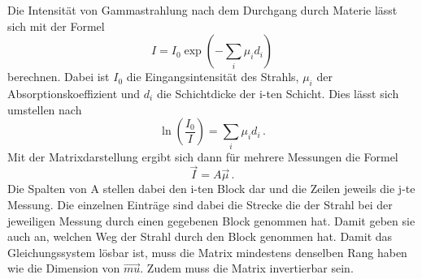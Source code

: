 Die Intensität von Gammastrahlung nach dem Durchgang durch Materie lässt sich mit der Formel
\begin{equation}
    I = I_0 \exp(-\sum_i \mu_i d_i)
\end{equation}
berechnen.
Dabei ist $I_0$ die Eingangsintensität des Strahls, $\mu_i$ der Absorptionskoeffizient und $d_i$ die Schichtdicke der i-ten Schicht.
Dies lässt sich umstellen nach
\begin{equation}
    \ln(\frac{I_0}{I}) = \sum_i \mu_i d_i \,.
\end{equation}
Mit der Matrixdarstellung ergibt sich dann für mehrere Messungen die Formel
\begin{equation}
    \label{eqn:matrixA}
    \vec{I} = A \vec{\mu} \,.
\end{equation}
Die Spalten von A stellen dabei den i-ten Block dar und die Zeilen jeweils die j-te Messung. Die einzelnen Einträge sind dabei die Strecke die der Strahl bei der jeweiligen Messung durch einen gegebenen Block genommen hat. Damit geben sie auch an, welchen Weg der Strahl durch den Block genommen hat.
Damit das Gleichungssystem lösbar ist, muss die Matrix mindestens denselben Rang haben wie die Dimension von $\vec{mu}$. Zudem muss die Matrix invertierbar sein.
